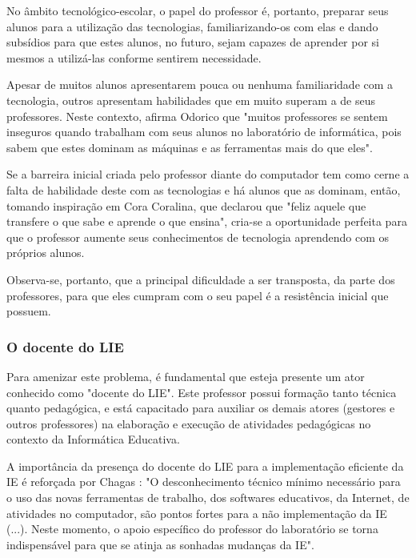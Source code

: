 No âmbito tecnológico-escolar, o papel do professor é, portanto, preparar seus alunos para a utilização das tecnologias, familiarizando-os com elas e dando subsídios para que estes alunos, no futuro, sejam capazes de aprender por si mesmos a utilizá-las conforme sentirem necessidade.

Apesar de muitos alunos apresentarem pouca ou nenhuma familiaridade com a tecnologia, outros apresentam habilidades que em muito superam a de seus professores. Neste contexto, afirma Odorico \cite{art:REF_ART_ODORICO} que "muitos professores se sentem inseguros quando trabalham com seus alunos no laboratório de informática, pois sabem que estes dominam as máquinas e as ferramentas mais do que eles".

Se a barreira inicial criada pelo professor diante do computador tem como cerne a falta de habilidade deste com as tecnologias e há alunos que as dominam, então, tomando inspiração em Cora Coralina, que declarou que "feliz aquele que transfere o que sabe e aprende o que ensina", cria-se a oportunidade perfeita para que o professor aumente seus conhecimentos de tecnologia aprendendo com os próprios alunos.

Observa-se, portanto, que a principal dificuldade a ser transposta, da parte dos professores, para que eles cumpram com o seu papel é a resistência inicial que possuem.

\subsubsection{O docente do LIE}\label{sec:LABEL_CHP_REF_TEO_SEC_DOC_LIE}

Para amenizar este problema, é fundamental que esteja presente um ator conhecido como "docente do LIE". Este professor possui formação tanto técnica quanto pedagógica, e está capacitado para auxiliar os demais atores (gestores e outros professores) na elaboração e execução de atividades pedagógicas no contexto da Informática Educativa.

A importância da presença do docente do LIE para a implementação eficiente da IE é reforçada por Chagas \cite{art:REF_ART_CHAGAS}: "O desconhecimento técnico mínimo necessário para o uso das novas ferramentas de trabalho, dos softwares educativos, da Internet, de atividades no computador, são pontos fortes para a não implementação da IE (...). Neste momento, o apoio específico do professor do laboratório se torna indispensável para que se atinja as sonhadas mudanças da IE".

